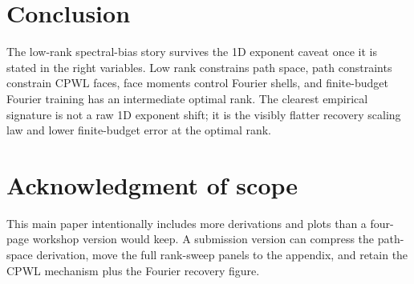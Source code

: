 \documentclass[10pt,twocolumn]{article}
\newcommand{\1}{\mathbf{1}}
\begin{document}
\section{Conclusion}
The low-rank spectral-bias story survives the 1D exponent caveat once it is stated in the right variables.  Low rank constrains path space, path constraints constrain CPWL faces, face moments control Fourier shells, and finite-budget Fourier training has an intermediate optimal rank.  The clearest empirical signature is not a raw 1D exponent shift; it is the visibly flatter recovery scaling law and lower finite-budget error at the optimal rank.

\appendix
\section*{Acknowledgment of scope}
This main paper intentionally includes more derivations and plots than a four-page workshop version would keep.  A submission version can compress the path-space derivation, move the full rank-sweep panels to the appendix, and retain the CPWL mechanism plus the Fourier recovery figure.
\end{document}
